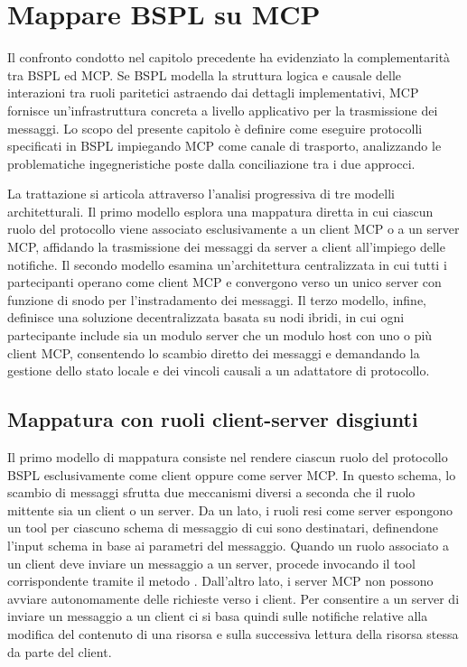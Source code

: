 \chapter{Mappare BSPL su MCP}\label{chap:3}

Il confronto condotto nel capitolo precedente ha evidenziato la complementarità tra BSPL ed MCP. Se BSPL modella la struttura logica e causale delle interazioni tra ruoli paritetici astraendo dai dettagli implementativi, MCP fornisce un'infrastruttura concreta a livello applicativo per la trasmissione dei messaggi. Lo scopo del presente capitolo è definire come eseguire protocolli specificati in BSPL impiegando MCP come canale di trasporto, analizzando le problematiche ingegneristiche poste dalla conciliazione tra i due approcci.

La trattazione si articola attraverso l'analisi progressiva di tre modelli architetturali. Il primo modello esplora una mappatura diretta in cui ciascun ruolo del protocollo viene associato esclusivamente a un client MCP o a un server MCP, affidando la trasmissione dei messaggi da server a client all'impiego delle notifiche. Il secondo modello esamina un'architettura centralizzata in cui tutti i partecipanti operano come client MCP e convergono verso un unico server con funzione di snodo per l'instradamento dei messaggi. Il terzo modello, infine, definisce una soluzione decentralizzata basata su nodi ibridi, in cui ogni partecipante include sia un modulo server che un modulo host con uno o più client MCP, consentendo lo scambio diretto dei messaggi e demandando la gestione dello stato locale e dei vincoli causali a un adattatore di protocollo.

\section{Mappatura con ruoli client-server disgiunti}\label{mappatura-disgiunta}

Il primo modello di mappatura consiste nel rendere ciascun ruolo del protocollo BSPL esclusivamente come client oppure come server MCP. In questo schema, lo scambio di messaggi sfrutta due meccanismi diversi a seconda che il ruolo mittente sia un client o un server. Da un lato, i ruoli resi come server espongono un tool per ciascuno schema di messaggio di cui sono destinatari, definendone l'input schema in base ai parametri del messaggio. Quando un ruolo associato a un client deve inviare un messaggio a un server, procede invocando il tool corrispondente tramite il metodo . Dall'altro lato, i server MCP non possono avviare autonomamente delle richieste verso i client. Per consentire a un server di inviare un messaggio a un client ci si basa quindi sulle notifiche relative alla modifica del contenuto di una risorsa e sulla successiva lettura della risorsa stessa da parte del client.

